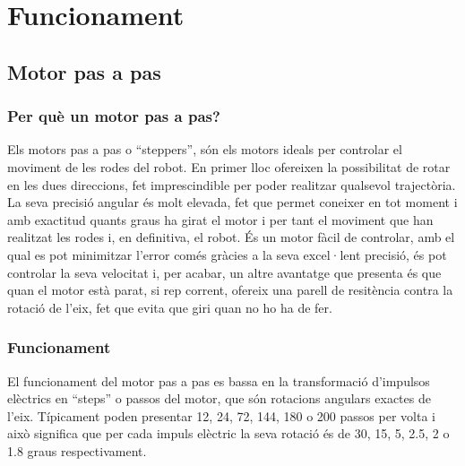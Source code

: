 \setlength\topmargin{8mm}
\onehalfspacing
\chapter{Funcionament} %

\label{Chapter2} %





\section{Motor pas a pas}
\subsection{Per què un motor pas a pas?}

Els motors pas a pas o “steppers”, són els motors ideals per controlar el moviment de les rodes del robot. En primer lloc ofereixen la possibilitat de rotar en les dues direccions, fet imprescindible per poder realitzar qualsevol trajectòria. La seva precisió angular és molt elevada, fet que permet coneixer en tot moment i amb exactitud quants graus ha girat el motor i per tant el moviment que han realitzat les rodes i, en definitiva, el robot. És un motor fàcil de controlar, amb el qual es pot minimitzar l'error comés gràcies a la seva excel·lent precisió, és pot controlar la seva velocitat i, per acabar, un altre avantatge que presenta és que quan el motor està parat, si rep corrent, ofereix una parell de resitència contra la rotació de l'eix, fet que evita que giri quan no ho ha de fer. 


\subsection{Funcionament}
El funcionament del motor pas a pas es bassa en la transformació d'impulsos elèctrics en “steps” o passos del motor, que són rotacions angulars exactes de l'eix. Típicament poden presentar 12, 24, 72, 144, 180 o 200 passos per volta i això significa que per cada impuls elèctric la seva rotació és de 30, 15, 5, 2.5, 2 o 1.8 graus respectivament. 


